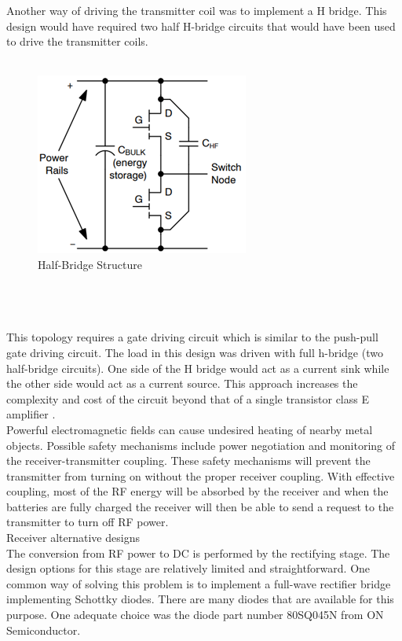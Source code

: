 \documentclass[12pt]{article}
\begin{document}
\indent
Another way of driving the transmitter coil was to implement a H bridge. This design would have required two half H-bridge circuits that would have been used to drive the transmitter coils.\\
\hfill \\
\begin{figure}[h!]
\centering
\includegraphics[width=0.4\linewidth]{circ_bridge}
\caption{Half-Bridge Structure \cite{questSCI2019}}
\end{figure}\\
\hfill \\
\pagebreak
\hfill \\
\indent
This topology requires a gate driving circuit which is similar to the push-pull gate driving circuit. The load in this design was driven with full h-bridge (two half-bridge circuits). One side of the H bridge would act as a current sink while the other side would act as a current source. This approach increases the complexity and cost of the circuit beyond that of a single transistor class E amplifier \cite{questSCI2019}.\\

\indent
Powerful electromagnetic fields can cause undesired heating of nearby metal objects. Possible safety mechanisms include power negotiation and monitoring of the receiver-transmitter coupling. These safety mechanisms will prevent the transmitter from turning on without the proper receiver coupling. With effective coupling, most of the RF energy will be absorbed by the receiver and when the batteries are fully charged the receiver will then be able to send a request to the transmitter to turn off RF power.\\

\noindent
Receiver alternative designs\\

\indent
The conversion from RF power to DC is performed by the rectifying stage. The design options for this stage are relatively limited and straightforward. One common way of solving this problem is to implement a full-wave rectifier bridge implementing Schottky diodes. There are many diodes that are available for this purpose. One adequate choice was the diode part number 80SQ045N from ON Semiconductor.\\
\end{document}
